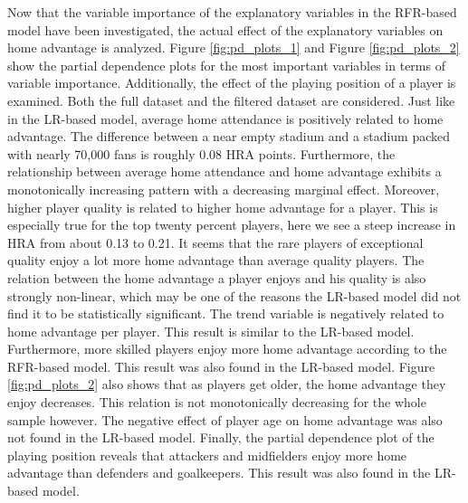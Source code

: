 \noindent
Now that the variable importance of the explanatory variables in the RFR-based model have been investigated, the actual effect of the explanatory variables on home advantage is analyzed. Figure \ref{fig:pd_plots_1} and Figure \ref{fig:pd_plots_2} show the partial dependence plots for the most important variables in terms of variable importance. Additionally, the effect of the playing position of a player is examined. Both the full dataset and the filtered dataset are considered. Just like in the LR-based model, average home attendance is positively related to home advantage. The difference between a near empty stadium and a stadium packed with nearly 70,000 fans is roughly 0.08 HRA points. Furthermore, the relationship between average home attendance and home advantage exhibits a monotonically increasing pattern with a decreasing marginal effect. Moreover, higher player quality is related to higher home advantage for a player. This is especially true for the top twenty percent players, here we see a steep increase in HRA from about 0.13 to 0.21. It seems that the rare players of exceptional quality enjoy a lot more home advantage than average quality players. The relation between the home advantage a player enjoys and his quality is also strongly non-linear, which may be one of the reasons the LR-based model did not find it to be statistically significant. The trend variable is negatively related to home advantage per player. This result is similar to the LR-based model. Furthermore, more skilled players enjoy more home advantage according to the RFR-based model. This result was also found in the LR-based model. Figure \ref{fig:pd_plots_2} also shows that as players get older, the home advantage they enjoy decreases. This relation is not monotonically decreasing for the whole sample however. The negative effect of player age on home advantage was also not found in the LR-based model. Finally, the partial dependence plot of the playing position reveals that attackers and midfielders enjoy more home advantage than defenders and goalkeepers. This result was also found in the LR-based model.

